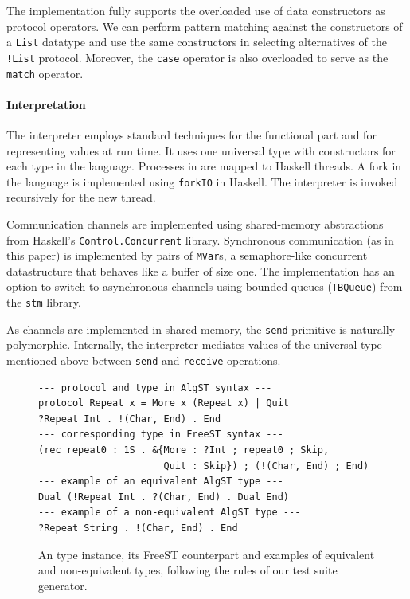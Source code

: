 The implementation fully supports the overloaded use of data
constructors as protocol operators. We can perform pattern matching against the constructors of
a \lstinline+List+ datatype and use the same constructors in selecting alternatives of the
\lstinline+!List+ protocol. Moreover, the \lstinline+case+ operator is also overloaded to serve as
the \lstinline+match+ operator.



\paragraph{Interpretation}
\label{sec:interpretation}

The interpreter employs
standard techniques for the functional part and for
representing values at run time. 
It uses one universal type 
with constructors for each type in the language.
Processes in \algst are mapped to
Haskell threads. A fork in the language is implemented
using \texttt{forkIO} in Haskell. The interpreter is invoked recursively
for the new thread.

Communication channels are implemented using shared-memory abstractions from
Haskell's \texttt{Control.Concurrent} library. Synchronous
communication (as in this paper) is implemented
by pairs of \texttt{MVar}s, a semaphore-like concurrent datastructure
\cite{DBLP:conf/popl/JonesGF96} that behaves like a buffer of size
one. The implementation has an option to switch to
asynchronous channels using bounded
queues (\texttt{TBQueue}) from the \texttt{stm} library.

As channels are implemented in shared memory, the 
\lstinline|send| primitive is naturally polymorphic. Internally, the interpreter mediates
values of the universal type mentioned above between \lstinline+send+ and
\lstinline+receive+ operations.

\label{sec:benchmarking}
\begin{figure}[tp]
\begin{lstlisting}[morekeywords={rec},moreemph={End}]
--- protocol and type in AlgST syntax ---
protocol Repeat x = More x (Repeat x) | Quit
?Repeat Int . !(Char, End) . End
--- corresponding type in FreeST syntax ---
(rec repeat0 : 1S . &{More : ?Int ; repeat0 ; Skip,
                      Quit : Skip}) ; (!(Char, End) ; End)
--- example of an equivalent AlgST type ---
Dual (!Repeat Int . ?(Char, End) . Dual End)
--- example of a non-equivalent AlgST type ---
?Repeat String . !(Char, End) . End
\end{lstlisting}
  \caption{An \algst type instance, its FreeST counterpart and examples of equivalent and non-equivalent \algst types, following the rules of our test suite generator.}
  \label{fig:generated-example}
\end{figure}

